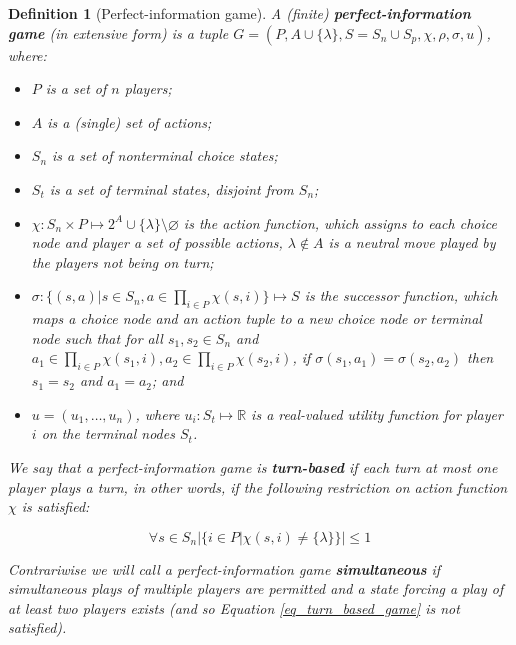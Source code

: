 \newtheorem*{defgpig}{Definition}
\begin{defgpig}[Perfect-information game]

A (finite) \textbf{perfect-information game} (in extensive form) is a tuple $G =
(P,A\cup\{\lambda\},S=S_n\cup S_p,\chi,\rho,\sigma,u)$, where:

\begin{itemize}

\item $P$ is a set of $n$ players;

\item $A$ is a (single) set of actions;

\item $S_n$ is a set of nonterminal choice states;

\item $S_t$ is a set of terminal states, disjoint from $S_n$;

\item $\chi: S_n \times P \mapsto 2^A \cup \{\lambda\} \setminus \varnothing$ is the action 
 function, which assigns to each choice node and player a set of possible actions, $\lambda \notin
 A$ is a neutral move played by the players not being on turn;

\item $\sigma: \{(s,a)| s \in S_n, a \in \prod\limits_{i\in P}\chi(s,i)\} \mapsto S$ is the
successor function, which maps a choice node and an action tuple to a new choice node or
terminal node such that for all $s_1, s_2 \in S_n$ and $a_1 \in \prod\limits_{i\in
P}\chi(s_1,i), a_2 \in \prod\limits_{i\in P}\chi(s_2,i)$, if 
$\sigma(s_1,a_1) = \sigma(s_2,a_2)$ then $s_1=s_2$ and $a_1=a_2$; and

\item $u = (u_1,\ldots,u_n)$, where $u_i: S_t \mapsto \mathbb{R}$ is a real-valued utility
function for player $i$ on the terminal nodes $S_t$.

\end{itemize}

We say that a perfect-information game is \textbf{turn-based} if each turn at most one player plays a
turn, in other words, if the following restriction on action function $\chi$ is satisfied:

\begin{equation}
\label{eq_turn_based_game}
\forall s \in S_n |\{i \in P|\chi(s,i) \not= \{\lambda\}\}| \le 1
\end{equation}

Contrariwise we will call a perfect-information game \textbf{simultaneous} if simultaneous
plays of multiple players are permitted and a state forcing a play of at least two players
exists (and so Equation \ref{eq_turn_based_game} is not satisfied).

\end{defgpig}

